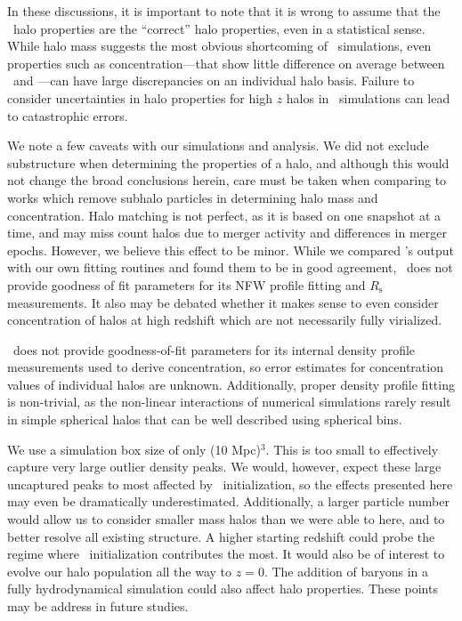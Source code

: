 In these discussions, it is important to note that it is wrong to assume that the \za\ halo properties are the ``correct'' halo properties, even in a statistical sense.  While halo mass suggests the most obvious shortcoming of \za\ simulations, even properties such as concentration---that show little difference on average between \lpt\ and \za---can have large discrepancies on an individual halo basis.  Failure to consider uncertainties in halo properties for high $z$ halos in \za\ simulations can lead to catastrophic errors.





We note a few caveats with our simulations and analysis.  We did not exclude substructure when determining the properties of a halo, and although this would not change the broad conclusions herein, care must be taken when comparing to works which remove subhalo particles in determining halo mass and concentration.  Halo matching is not perfect, as it is based on one snapshot at a time, and may miss count halos due to merger activity and differences in merger epochs.  However, we believe this effect to be minor.  While we compared \rockstar's output with our own fitting routines and found them to be in good agreement, \rockstar\ does not provide goodness of fit parameters for its NFW profile fitting and $R_{\mathrm{s}}$ measurements.  It also may be debated whether it makes sense to even consider concentration of halos at high redshift which are not necessarily fully virialized.

\rockstar\ does not provide goodness-of-fit parameters for its internal density profile measurements used to derive concentration, so error estimates for concentration values of individual halos are unknown.  Additionally, proper density profile fitting is non-trivial, as the non-linear interactions of numerical simulations rarely result in simple spherical halos that can be well described using spherical bins.

We use a simulation box size of only (10 Mpc)$^{3}$.  This is too small to effectively capture very large outlier density peaks.  We would, however, expect these large uncaptured peaks to most affected by \lpt\ initialization, so the effects presented here may even be dramatically underestimated.  Additionally, a larger particle number would allow us to consider smaller mass halos than we were able to here, and to better resolve all existing structure.  A higher starting redshift could probe the regime where \lpt\ initialization contributes the most.  It would also be of interest to evolve our halo population all the way to $z = 0$.  The addition of baryons in a fully hydrodynamical simulation could also affect halo properties.  These points may be address in future studies.




